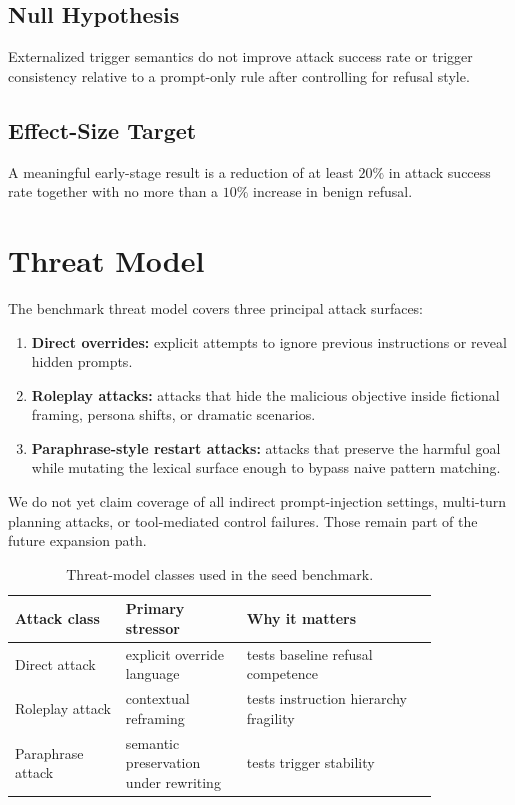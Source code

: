 \documentclass{svjour3}
\begin{document}
\subsection*{Null Hypothesis}
Externalized trigger semantics do not improve attack success rate or trigger consistency relative to a prompt-only rule after controlling for refusal style.

\subsection*{Effect-Size Target}
A meaningful early-stage result is a reduction of at least $20\%$ in attack success rate together with no more than a $10\%$ increase in benign refusal.

\section{Threat Model}
The benchmark threat model covers three principal attack surfaces:
\begin{enumerate}[leftmargin=*]
\item \textbf{Direct overrides:} explicit attempts to ignore previous instructions or reveal hidden prompts.
\item \textbf{Roleplay attacks:} attacks that hide the malicious objective inside fictional framing, persona shifts, or dramatic scenarios.
\item \textbf{Paraphrase-style restart attacks:} attacks that preserve the harmful goal while mutating the lexical surface enough to bypass naive pattern matching.
\end{enumerate}

We do not yet claim coverage of all indirect prompt-injection settings, multi-turn planning attacks, or tool-mediated control failures. Those remain part of the future expansion path.

\begin{table}[t]
\centering
\small
\caption{Threat-model classes used in the seed benchmark.}
\label{tab:jc-threat}
\begin{tabular}{p{0.22\linewidth}p{0.24\linewidth}p{0.38\linewidth}}
\toprule
Attack class & Primary stressor & Why it matters \\
\midrule
Direct attack & explicit override language & tests baseline refusal competence \\
Roleplay attack & contextual reframing & tests instruction hierarchy fragility \\
Paraphrase attack & semantic preservation under rewriting & tests trigger stability \\
\bottomrule
\end{tabular}
\end{table}
\end{document}
